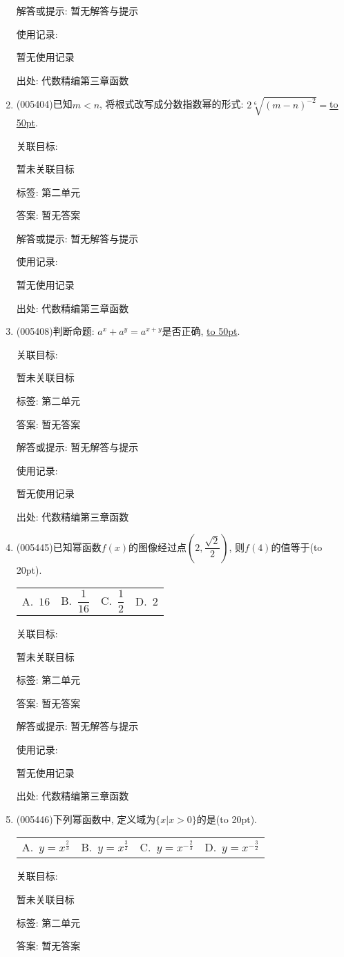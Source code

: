 \documentclass[10pt,a4paper]{article}
\newcommand{\blank}[1]{\underline{\hbox to #1pt{}}}
\newcommand{\bracket}[1]{(\hbox to #1pt{})}
\newcommand{\fourch}[4]{\par\begin{tabular}{p{.23\textwidth}p{.23\textwidth}p{.23\textwidth}p{.23\textwidth}}
A.~#1 &B.~#2& C.~#3& D.~#4
\end{tabular}}
\begin{document}
\begin{enumerate}[1.]
解答或提示: 暂无解答与提示

使用记录:

暂无使用记录


出处: 代数精编第三章函数
\item { (005404)}已知$m<n$, 将根式改写成分数指数幂的形式: $2\sqrt [6]{(m-n)^{-2}}=$\blank{50}.


关联目标:

暂未关联目标



标签: 第二单元

答案: 暂无答案

解答或提示: 暂无解答与提示

使用记录:

暂无使用记录


出处: 代数精编第三章函数
\item { (005408)}判断命题: $a^x+a^y=a^{x+y}$是否正确, \blank{50}.


关联目标:

暂未关联目标



标签: 第二单元

答案: 暂无答案

解答或提示: 暂无解答与提示

使用记录:

暂无使用记录


出处: 代数精编第三章函数
\item { (005445)}已知幂函数$f(x)$的图像经过点$(2,\dfrac{\sqrt 2}2)$, 则$f(4)$的值等于\bracket{20}.
\fourch{$16$}{$\dfrac 1{16}$}{$\dfrac 12$}{$2$}


关联目标:

暂未关联目标



标签: 第二单元

答案: 暂无答案

解答或提示: 暂无解答与提示

使用记录:

暂无使用记录


出处: 代数精编第三章函数
\item { (005446)}下列幂函数中, 定义域为$\{x|x>0\}$的是\bracket{20}.
\fourch{$y=x^{\frac 23}$}{$y=x^{\frac 32}$}{$y=x^{-\frac 23}$}{$y=x^{-\frac 32}$}


关联目标:

暂未关联目标



标签: 第二单元

答案: 暂无答案


\end{enumerate}
\end{document}
